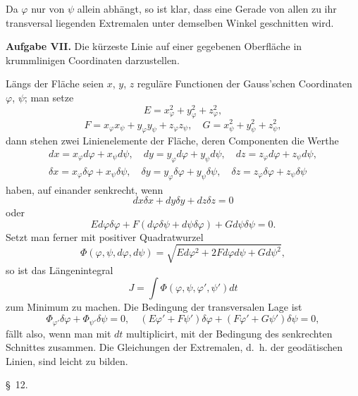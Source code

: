 \documentclass[11pt,a4paper,leqno]{article}
\begin{document}
Da $\varphi$ nur von $\psi$ allein abhängt, so ist klar, dass eine Gerade von allen zu ihr transversal liegenden Extremalen unter demselben Winkel geschnitten wird.

\medskip
\noindent\textbf{Aufgabe VII.} Die kürzeste Linie auf einer gegebenen Oberfläche in krummlinigen Coordinaten darzustellen.

Längs der Fläche seien $x$, $y$, $z$ reguläre Functionen der Gauss'schen Coordinaten $\varphi$, $\psi$; man setze
\[
E=x_\varphi^2+y_\varphi^2+z_\varphi^2,
\]
\[
F=x_\varphi x_\psi+y_\varphi y_\psi+z_\varphi z_\psi,\quad
G=x_\psi^2+y_\psi^2+z_\psi^2,
\]
dann stehen zwei Linienelemente der Fläche, deren Componenten die Werthe
\[
\begin{gathered}
dx=x_\varphi d\varphi+x_\psi d\psi,\quad dy=y_\varphi d\varphi+y_\psi d\psi,\quad dz=z_\varphi d\varphi+z_\psi d\psi,\\
\delta x=x_\varphi \delta\varphi+x_\psi \delta\psi,\quad \delta y=y_\varphi \delta\varphi+y_\psi \delta\psi,\quad \delta z=z_\varphi \delta\varphi+z_\psi \delta\psi
\end{gathered}
\]
haben, auf einander senkrecht, wenn
\[
dx\delta x+dy\delta y+dz\delta z=0
\]
oder
\[
Ed\varphi\delta\varphi+F(d\varphi\delta\psi+d\psi\delta\varphi)+Gd\psi\delta\psi=0.
\]
Setzt man ferner mit positiver Quadratwurzel
\[
\Phi(\varphi,\psi,d\varphi,d\psi)=\sqrt{Ed\varphi^2+2Fd\varphi d\psi+Gd\psi^2},
\]
so ist das Längenintegral
\[
J=\int \Phi(\varphi,\psi,\varphi',\psi')dt
\]
zum Minimum zu machen. Die Bedingung der transversalen Lage ist
\[
\Phi_{\varphi'}\delta\varphi+\Phi_{\psi'}\delta\psi=0,\quad
(E\varphi'+F\psi')\delta\varphi+(F\varphi'+G\psi')\delta\psi=0,
\]
fällt also, wenn man mit $dt$ multiplicirt, mit der Bedingung des senkrechten Schnittes zusammen. Die Gleichungen der Extremalen, d.~h. der geodätischen Linien, sind leicht zu bilden.

\begin{center}{\large \S~12.}\end{center}
\end{document}
